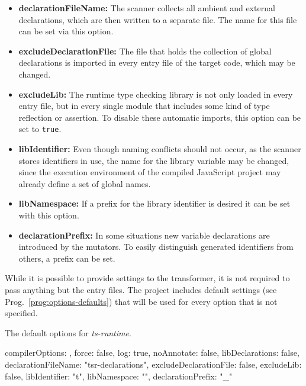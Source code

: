 \begin{itemize}
  \item \textbf{declarationFileName:} The scanner collects all ambient and external declarations, which are then written to a separate file. The name for this file can be set via this option.
  \item \textbf{excludeDeclarationFile:} The file that holds the collection of global declarations is imported in every entry file of the target code, which may be changed.
  \item \textbf{excludeLib:} The runtime type checking library is not only loaded in every entry file, but in every single module that includes some kind of type reflection or assertion. To disable these automatic imports, this option can be set to \texttt{true}.
  \item \textbf{libIdentifier:} Even though naming conflicts should not occur, as the scanner stores identifiers in use, the name for the library variable may be changed, since the execution environment of the compiled JavaScript project may already define a set of global names.
  \item \textbf{libNamespace:} If a prefix for the library identifier is desired it can be set with this option.
  \item \textbf{declarationPrefix:} In some situations new variable declarations are introduced by the mutators. To easily distinguish generated identifiers from others, a prefix can be set.
\end{itemize}
While it is possible to provide settings to the transformer, it is not required to pass anything but the entry files. The project includes default settings (see Prog.~\ref{prog:options-defaults}) that will be used for every option that is not specified.
\begin{program}
\caption{The default options for \emph{ts-runtime}.}
\label{prog:options-defaults}
\begin{JsCode}
{
  compilerOptions: {},
  force: false,
  log: true,
  noAnnotate: false,
  libDeclarations: false,
  declarationFileName: "tsr-declarations",
  excludeDeclarationFile: false,
  excludeLib: false,
  libIdentifier: "t",
  libNamespace: "",
  declarationPrefix: "_"
}
\end{JsCode}
\end{program}

